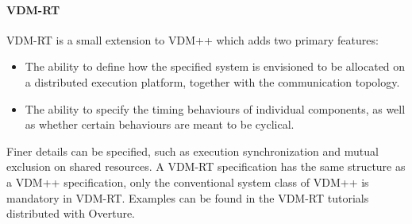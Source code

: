 \paragraph{VDM-RT}
VDM-RT is a small extension to VDM++ which adds two primary features:
%
%
%
\begin{itemize}
%
\item  The ability to define how the specified system is envisioned to be allocated on a distributed execution platform, together with the communication topology.
%
\item  The ability to specify the timing behaviours of individual components, as well as whether certain behaviours are meant to be cyclical.
%
\end{itemize}
%
Finer details can be specified, such as execution synchronization and mutual exclusion on shared resources.
%
A VDM-RT specification has the same structure as a VDM++ specification, only the conventional system class of VDM++ is mandatory in VDM-RT.
%
Examples can be found in the VDM-RT tutorials distributed with Overture.
%
%
%
